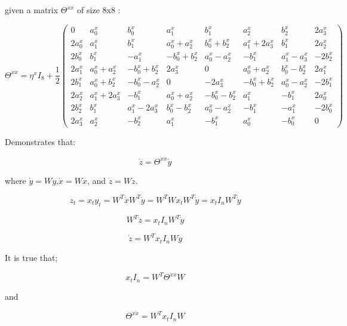 \documentclass{article}\usepackage[]{graphicx}\usepackage[]{color}
\begin{document}
given a matrix $\Theta^{\dot x\dot x}$  of size 8x8 :


$$\Theta^{\dot x\dot x} = \eta^x I_8+\frac{1}2\left(
\begin{array}{cccccccc}
0& a_0^x& b_0^x & a_1^x & b_1^x & a_2^x & b_2^x& 2a_3^x \\
2a_0^x& a_1^x& b_1^x & a_0^x+a_2^x & b_0^x+b_2^x & a_1^x+2a_3^x & b_1^x& 2a_2^x \\
2b_0^x& b_1^x&- a_1^x & -b_0^x+b_2^x & a_0^x-a_2^x &- b_1^x &a_1^x- a_3^x &- 2b_2^x \\
2a_1^x& a_0^x+a_2^x&- b_0^x+b_2^x & 2a_3^x &0 & a_0^x+a_2^x & b_0^x-b_2^x& 2a_1^x \\
2b_1^x& a_0^x+b_2^x&- b_0^x-a_2^x &0& -2a_3^x & -b_0^x+b_2^x & a_0^x-a_2^x& -2b_1^x \\
2a_2^x& a_1^x+2a_3^x&- b_1^x & a_0^x+a_2^x &-b_0^x-b_2^x & a_1^x &- b_1^x& 2a_0^x \\
2b_2^x& b_1^x& a_1^x-2a_3^x & b_0^x-b_2^x &a_0^x-a_2^x & -b_1^x &- a_1^x& -2b_0^x \\
2a_3^x& a_2^x& -b_2^x & a_1^x &- b_1^x & a_0^x & -b_0^x&  0 
\end{array}
\right)$$



Demonstrates that:

$$\dot z=\Theta^{\dot x\dot x}\dot y$$
    
where $\dot y = Wy$,$ \dot x = Wx$, and $ \dot z = Wz$.


$$z_t = x_t y_t = W^T\dot x W^T\dot y = W^T Wx_t W^T\dot y = x_t I_n W^T\dot y$$

$$W^T\dot z=x_t I_n W^T\dot y$$

$$\dot z=W^Tx_tI_nW\dot y$$

It is true that;

$$x_tI_n=W^T\Theta^{\dot x\dot x}W$$

and

$$\Theta^{\dot x\dot x}=W^Tx_tI_nW$$
 
 
\end{document}
